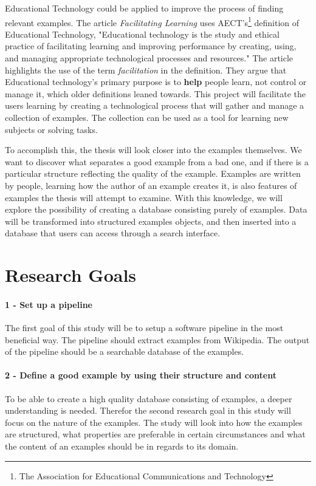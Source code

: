 Educational Technology could be applied to improve the process of finding relevant examples. The article \textit{Facilitating Learning} \cite{e-learning} uses AECT's\footnote{The Association for Educational Communications and Technology} definition of Educational Technology, "Educational technology is the study and ethical practice of facilitating learning and improving performance by creating, using, and managing appropriate technological processes and resources." The article highlights the use of the term \textit{facilitation} in the definition. They argue that Educational technology's primary purpose is to \textbf{help} people learn, not control or manage it, which older definitions leaned towards. This project will facilitate the users learning by creating a technological process that will gather and manage a collection of examples. The collection can be used as a tool for learning new subjects or solving tasks.

To accomplish this, the thesis will look closer into the examples themselves. We want to discover what separates a good example from a bad one, and if there is a particular structure reflecting the quality of the example. Examples are written by people, learning how the author of an example creates it, is also features of examples the thesis will attempt to examine. With this knowledge, we will explore the possibility of creating a database consisting purely of examples. Data will be transformed into structured examples objects, and then inserted into a database that users can access through a search interface. 



\section{Research Goals}


\paragraph{1 - Set up a pipeline}
The first goal of this study will be to setup a software pipeline in the most beneficial way. The pipeline should extract examples from Wikipedia. The output of the pipeline should be a searchable database of the examples.

\paragraph{2 - Define a good example by using their structure and content}
To be able to create a high quality database consisting of examples, a deeper understanding is needed. Therefor the second research goal in this study will focus on the nature of the examples. The study will look into how the examples are structured, what properties are preferable in certain circumstances and what the content of an examples should be in regards to its domain. 

